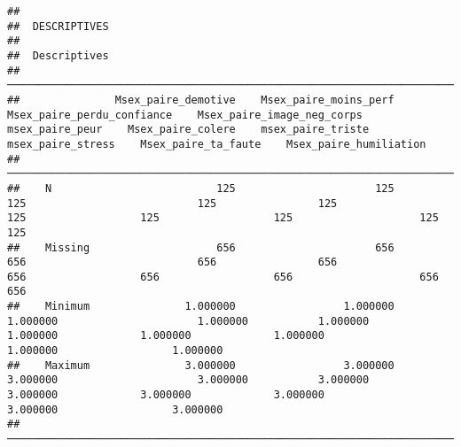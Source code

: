 \documentclass[
]{article}
\begin{document}
\begin{verbatim}
## 
##  DESCRIPTIVES
## 
##  Descriptives                                                                                                                                                                                                                                               
##  ────────────────────────────────────────────────────────────────────────────────────────────────────────────────────────────────────────────────────────────────────────────────────────────────────────────────────────────────────────────────────────── 
##               Msex_paire_demotive    Msex_paire_moins_perf    Msex_paire_perdu_confiance    Msex_paire_image_neg_corps    msex_paire_peur    Msex_paire_colere    msex_paire_triste    msex_paire_stress    Msex_paire_ta_faute    Msex_paire_humiliation   
##  ────────────────────────────────────────────────────────────────────────────────────────────────────────────────────────────────────────────────────────────────────────────────────────────────────────────────────────────────────────────────────────── 
##    N                          125                      125                           125                           125                125                  125                  125                  125                    125                       125   
##    Missing                    656                      656                           656                           656                656                  656                  656                  656                    656                       656   
##    Minimum               1.000000                 1.000000                      1.000000                      1.000000           1.000000             1.000000             1.000000             1.000000               1.000000                  1.000000   
##    Maximum               3.000000                 3.000000                      3.000000                      3.000000           3.000000             3.000000             3.000000             3.000000               3.000000                  3.000000   
##  ──────────────────────────────────────────────────────────────────────────────────────────────────────────────────────────────────────────────────────────────────────────────────────────────────────────────────────────────────────────────────────────
\end{verbatim}
\end{document}
